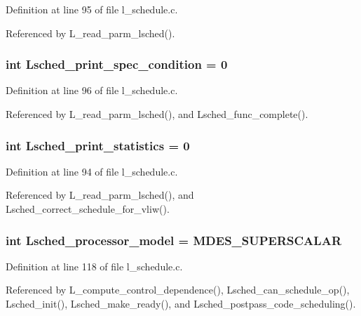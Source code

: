 Definition at line 95 of file l\_\-schedule.c.

Referenced by L\_\-read\_\-parm\_\-lsched().
\subsubsection{\setlength{\rightskip}{0pt plus 5cm}int \bf{Lsched\_\-print\_\-spec\_\-condition} = 0}\label{l__schedule_8c_c3946267c46785410b547ee22a070b17}




Definition at line 96 of file l\_\-schedule.c.

Referenced by L\_\-read\_\-parm\_\-lsched(), and Lsched\_\-func\_\-complete().
\subsubsection{\setlength{\rightskip}{0pt plus 5cm}int \bf{Lsched\_\-print\_\-statistics} = 0}\label{l__schedule_8c_e677cd429292523a696a32d17cc7e389}




Definition at line 94 of file l\_\-schedule.c.

Referenced by L\_\-read\_\-parm\_\-lsched(), and Lsched\_\-correct\_\-schedule\_\-for\_\-vliw().
\subsubsection{\setlength{\rightskip}{0pt plus 5cm}int \bf{Lsched\_\-processor\_\-model} = MDES\_\-SUPERSCALAR}\label{l__schedule_8c_4d59bf1a4de63a2857de2b9f53abd7b2}




Definition at line 118 of file l\_\-schedule.c.

Referenced by L\_\-compute\_\-control\_\-dependence(), Lsched\_\-can\_\-schedule\_\-op(), Lsched\_\-init(), Lsched\_\-make\_\-ready(), and Lsched\_\-postpass\_\-code\_\-scheduling().

